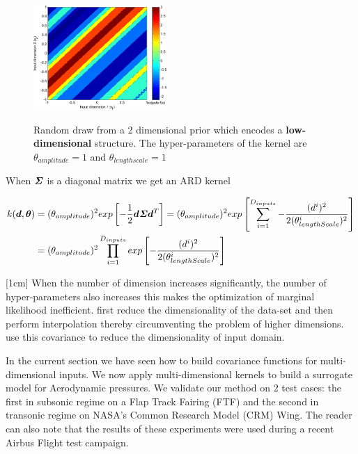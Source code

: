 \begin{figure}[!ht]
  \centering
   \includegraphics[width=0.45\textwidth]
        {images/part2/drawsLowMultiDimensional}
        \label{subFigdrawsLowMultiDimensional}
  \caption{Random draw from a 2 dimensional prior which encodes a \textbf{low-dimensional} structure. The hyper-parameters of the kernel are $\theta_{amplitude}=1$ and $\theta_{lengthscale}=1$}
\end{figure}

When $\bm{\mathit{\Sigma}}$ is a diagonal matrix we get an ARD kernel

\begin{equation}
\begin{aligned}
k(\boldsymbol{d}, \boldsymbol{\theta}) & = (\theta_{amplitude})^2  exp\left [  -\frac{1}{2} \boldsymbol{d} \bm{\mathit{\Sigma}} \boldsymbol{d}^T \right ] = 
(\theta_{amplitude})^2  exp\left [ \sum_{i=1}^{D_{inputs}} -\frac{(d^{i})^2}{2(\theta_{lengthScale}^{i})^2} \right ] \\
& = (\theta_{amplitude})^2 \prod_{i=1}^{D_{inputs}}  exp\left [ -\frac{(d^{i})^2}{2(\theta_{lengthScale}^{i})^2} \right ]
\end{aligned}
\end{equation}

[1cm]
When the number of dimension increases significantly, the number of hyper-parameters also increases this makes the optimization of marginal likelihood inefficient. \cite{bouhlel2016improved} first reduce the dimensionality of the data-set and then perform interpolation thereby circumventing the problem of higher dimensions. \cite{garnett2013active, tripathy2016gaussian} use this covariance to reduce the dimensionality of input domain.

In the current section we have seen how to build covariance functions for multi-dimensional inputs. We now apply multi-dimensional kernels to build a surrogate model for Aerodynamic pressures. We validate our method on 2 test cases: the first in subsonic regime on a Flap Track Fairing (FTF) and the second in transonic regime on NASA's Common Research Model (CRM) Wing. The reader can also note that the results of these experiments were used during a recent Airbus Flight test campaign.

